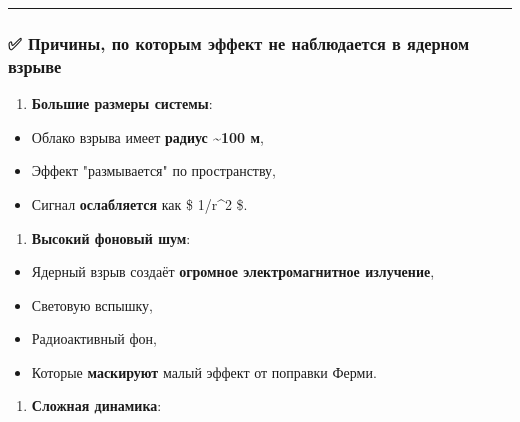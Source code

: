 \documentclass[11pt]{article}
\providecommand{\tightlist}{%
      \setlength{\itemsep}{0pt}\setlength{\parskip}{0pt}}
\begin{document}
\begin{center}\rule{0.5\linewidth}{\linethickness}\end{center}

\subsubsection{✅ Причины, по которым эффект не наблюдается в ядерном
взрыве}\label{ux43fux440ux438ux447ux438ux43dux44b-ux43fux43e-ux43aux43eux442ux43eux440ux44bux43c-ux44dux444ux444ux435ux43aux442-ux43dux435-ux43dux430ux431ux43bux44eux434ux430ux435ux442ux441ux44f-ux432-ux44fux434ux435ux440ux43dux43eux43c-ux432ux437ux440ux44bux432ux435}

\begin{enumerate}
\def\labelenumi{\arabic{enumi}.}
\tightlist
\item
  \textbf{Большие размеры системы}:\\
\end{enumerate}

\begin{itemize}
\tightlist
\item
  Облако взрыва имеет \textbf{радиус \textasciitilde{}100 м},\\
\item
  Эффект "размывается" по пространству,\\
\item
  Сигнал \textbf{ослабляется} как \$ 1/r\^{}2 \$.
\end{itemize}

\begin{enumerate}
\def\labelenumi{\arabic{enumi}.}
\setcounter{enumi}{1}
\tightlist
\item
  \textbf{Высокий фоновый шум}:\\
\end{enumerate}

\begin{itemize}
\tightlist
\item
  Ядерный взрыв создаёт \textbf{огромное электромагнитное излучение},\\
\item
  Световую вспышку,\\
\item
  Радиоактивный фон,\\
\item
  Которые \textbf{маскируют} малый эффект от поправки Ферми.
\end{itemize}

\begin{enumerate}
\def\labelenumi{\arabic{enumi}.}
\setcounter{enumi}{2}
\tightlist
\item
  \textbf{Сложная динамика}:\\
\end{enumerate}
\end{document}
